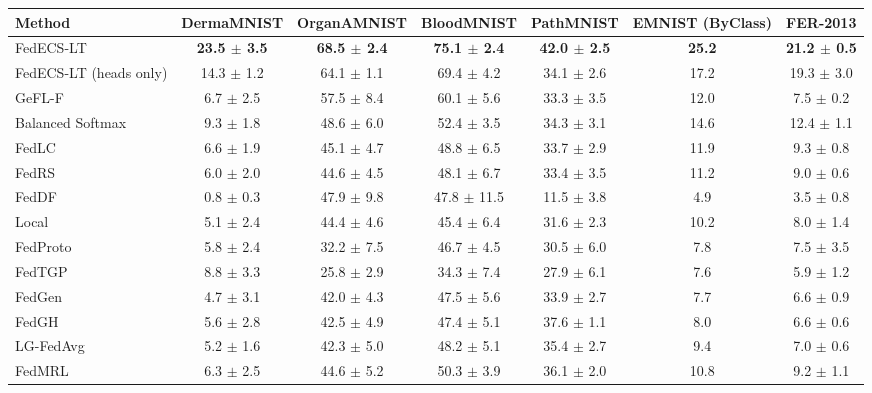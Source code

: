 \begin{tabular}{lcccccc}
\toprule
Method & DermaMNIST & OrganAMNIST & BloodMNIST & PathMNIST & EMNIST (ByClass) & FER-2013\\
\midrule
FedECS-LT & \textbf{23.5 $\pm$ 3.5} & \textbf{68.5 $\pm$ 2.4} & \textbf{75.1 $\pm$ 2.4} & \textbf{42.0 $\pm$ 2.5} & \textbf{25.2} & \textbf{21.2 $\pm$ 0.5}\\
FedECS-LT (heads only) & 14.3 $\pm$ 1.2 & 64.1 $\pm$ 1.1 & 69.4 $\pm$ 4.2 & 34.1 $\pm$ 2.6 & 17.2 & 19.3 $\pm$ 3.0\\
GeFL-F & 6.7 $\pm$ 2.5 & 57.5 $\pm$ 8.4 & 60.1 $\pm$ 5.6 & 33.3 $\pm$ 3.5 & 12.0 & 7.5 $\pm$ 0.2\\
Balanced Softmax & 9.3 $\pm$ 1.8 & 48.6 $\pm$ 6.0 & 52.4 $\pm$ 3.5 & 34.3 $\pm$ 3.1 & 14.6 & 12.4 $\pm$ 1.1\\
FedLC & 6.6 $\pm$ 1.9 & 45.1 $\pm$ 4.7 & 48.8 $\pm$ 6.5 & 33.7 $\pm$ 2.9 & 11.9 & 9.3 $\pm$ 0.8\\
FedRS & 6.0 $\pm$ 2.0 & 44.6 $\pm$ 4.5 & 48.1 $\pm$ 6.7 & 33.4 $\pm$ 3.5 & 11.2 & 9.0 $\pm$ 0.6\\
FedDF & 0.8 $\pm$ 0.3 & 47.9 $\pm$ 9.8 & 47.8 $\pm$ 11.5 & 11.5 $\pm$ 3.8 & 4.9 & 3.5 $\pm$ 0.8\\
Local & 5.1 $\pm$ 2.4 & 44.4 $\pm$ 4.6 & 45.4 $\pm$ 6.4 & 31.6 $\pm$ 2.3 & 10.2 & 8.0 $\pm$ 1.4\\
FedProto & 5.8 $\pm$ 2.4 & 32.2 $\pm$ 7.5 & 46.7 $\pm$ 4.5 & 30.5 $\pm$ 6.0 & 7.8 & 7.5 $\pm$ 3.5\\
FedTGP & 8.8 $\pm$ 3.3 & 25.8 $\pm$ 2.9 & 34.3 $\pm$ 7.4 & 27.9 $\pm$ 6.1 & 7.6 & 5.9 $\pm$ 1.2\\
FedGen & 4.7 $\pm$ 3.1 & 42.0 $\pm$ 4.3 & 47.5 $\pm$ 5.6 & 33.9 $\pm$ 2.7 & 7.7 & 6.6 $\pm$ 0.9\\
FedGH & 5.6 $\pm$ 2.8 & 42.5 $\pm$ 4.9 & 47.4 $\pm$ 5.1 & 37.6 $\pm$ 1.1 & 8.0 & 6.6 $\pm$ 0.6\\
LG-FedAvg & 5.2 $\pm$ 1.6 & 42.3 $\pm$ 5.0 & 48.2 $\pm$ 5.1 & 35.4 $\pm$ 2.7 & 9.4 & 7.0 $\pm$ 0.6\\
FedMRL & 6.3 $\pm$ 2.5 & 44.6 $\pm$ 5.2 & 50.3 $\pm$ 3.9 & 36.1 $\pm$ 2.0 & 10.8 & 9.2 $\pm$ 1.1\\
\bottomrule
\end{tabular}
